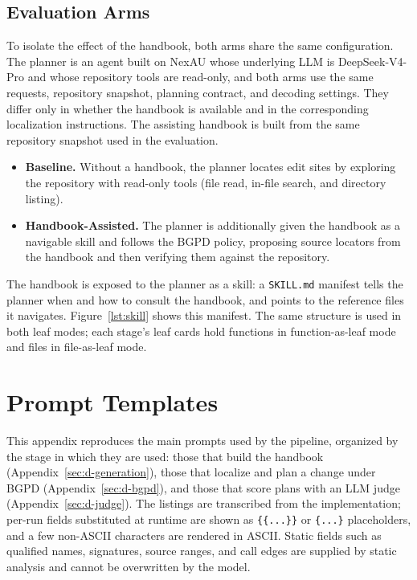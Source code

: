 \documentclass[]{ailab}
\newcommand{\hbsmall}{\textsf{function-as-leaf}}
\newcommand{\hblarge}{\textsf{file-as-leaf}}
\begin{document}
\subsection{Evaluation Arms}

To isolate the effect of the handbook, both arms share the same configuration. The
planner is an agent built on NexAU whose underlying LLM is DeepSeek-V4-Pro and
whose repository tools are read-only, and both arms use the same requests,
repository snapshot, planning contract, and decoding settings. They differ only in
whether the handbook is available and in the corresponding localization
instructions. The assisting handbook is built from the same repository snapshot
used in the evaluation.

\begin{itemize}[leftmargin=1.4em,itemsep=1pt,topsep=1pt,parsep=0pt]
\item \textbf{Baseline.} Without a handbook, the planner locates edit sites by
exploring the repository with read-only tools (file read, in-file search, and
directory listing).
\item \textbf{Handbook-Assisted.} The planner is additionally given the handbook as
a navigable skill and follows the BGPD policy, proposing source locators from the
handbook and then verifying them against the repository.
\end{itemize}

The handbook is exposed to the planner as a skill: a \texttt{SKILL.md} manifest
tells the planner when and how to consult the handbook, and points to the
reference files it navigates. Figure~\ref{lst:skill} shows this manifest. The
same structure is used in both leaf modes; each stage's leaf cards hold functions
in \hbsmall{} mode and files in \hblarge{} mode.

\begingroup
\makeatletter
\setlength{\@fptop}{0pt}
\setlength{\@fpbot}{0pt plus 1fil}
\makeatother
\clearpage
\endgroup
\section{Prompt Templates}
\label{app:prompts}

This appendix reproduces the main prompts used by the pipeline, organized by the
stage in which they are used: those that build the handbook
(Appendix~\ref{sec:d-generation}), those that localize and plan a change under
BGPD (Appendix~\ref{sec:d-bgpd}), and those that score plans with an LLM judge
(Appendix~\ref{sec:d-judge}). The listings are transcribed from the
implementation; per-run fields substituted at runtime are shown as
\texttt{\{\{...\}\}} or \texttt{\{...\}} placeholders, and a few non-ASCII
characters are rendered in ASCII. Static fields such as qualified names,
signatures, source ranges, and call edges are supplied by static analysis and
cannot be overwritten by the model.
\end{document}
